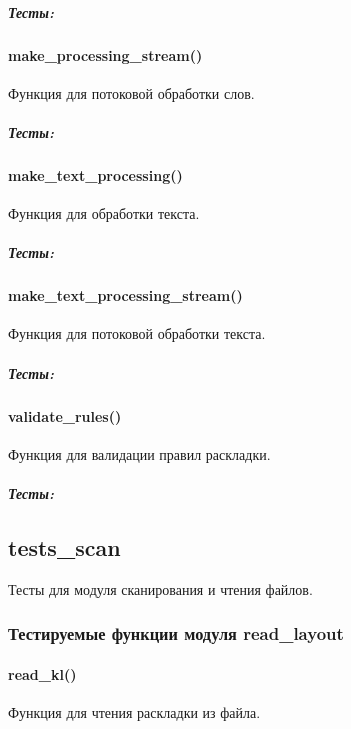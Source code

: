 \documentclass[a4paper,11pt,russian,openany,oneside]{sphinxmanual}
\begin{document}
\subparagraph{Тесты:}
\label{\detokenize{tests_module:id20}}

\paragraph{make\_processing\_stream()}
\label{\detokenize{tests_module:make-processing-stream}}
\sphinxAtStartPar
Функция для потоковой обработки слов.


\subparagraph{Тесты:}
\label{\detokenize{tests_module:id21}}

\paragraph{make\_text\_processing()}
\label{\detokenize{tests_module:make-text-processing}}
\sphinxAtStartPar
Функция для обработки текста.


\subparagraph{Тесты:}
\label{\detokenize{tests_module:id22}}

\paragraph{make\_text\_processing\_stream()}
\label{\detokenize{tests_module:make-text-processing-stream}}
\sphinxAtStartPar
Функция для потоковой обработки текста.


\subparagraph{Тесты:}
\label{\detokenize{tests_module:id23}}

\paragraph{validate\_rules()}
\label{\detokenize{tests_module:validate-rules}}
\sphinxAtStartPar
Функция для валидации правил раскладки.


\subparagraph{Тесты:}
\label{\detokenize{tests_module:id24}}

\subsection{tests\_scan}
\label{\detokenize{tests_module:tests-scan}}
\sphinxAtStartPar
Тесты для модуля сканирования и чтения файлов.


\subsubsection{Тестируемые функции модуля read\_layout}
\label{\detokenize{tests_module:read-layout}}

\paragraph{read\_kl()}
\label{\detokenize{tests_module:read-kl}}
\sphinxAtStartPar
Функция для чтения раскладки из файла.
\end{document}
